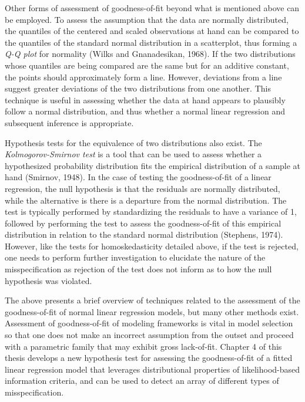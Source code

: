		Other forms of assessment of goodness-of-fit beyond what is mentioned above can be employed. To assess the assumption that the data are normally distributed, the quantiles of the centered
		and scaled observations at hand can be compared to the quantiles of the standard normal distribution in a scatterplot, thus forming a \textit{Q-Q plot} for normality (Wilks and Gnanadesikan, 1968).
		If the two distributions whose quantiles are being compared are the same but for an additive constant, the points should approximately form a line. However, deviations from a line suggest
		greater deviations of the two distributions from one another. This technique is useful in assessing whether the data at hand appears to plausibly follow a normal distribution, and thus
		whether a normal linear regression and subsequent inference is appropriate.
		
		Hypothesis tests for the equivalence of two distributions also exist. The \textit{Kolmogorov-Smirnov test} is a tool that can be used to assess whether a hypothesized probability distribution
		fits the empirical distribution of a sample at hand (Smirnov, 1948). In the case of testing the goodness-of-fit of a linear regression, the null hypothesis is that the residuals are normally
		distributed, while the alternative is there is a departure from the normal distribution. The test is typically performed by standardizing the residuals to have a variance of 1,
		followed by performing the test to assess the goodness-of-fit of this empirical distribution in relation to the standard normal distribution (Stephens, 1974). However, like the tests for
		homoskedasticity detailed above, if the test is rejected, one needs to perform further investigation to elucidate the nature of the misspecification as rejection of the test does not inform
		as to how the null hypothesis was violated.

		The above presents a brief overview of techniques related to the assessment of the goodness-of-fit of normal linear regression models, but many other methods exist. Assessment of goodness-of-fit
		of modeling frameworks is vital in model selection so that one does not make an incorrect assumption from the outset and proceed with a parametric family that may exhibit gross lack-of-fit.
		Chapter 4 of this thesis develops a new hypothesis test for assessing the goodness-of-fit of a fitted linear regression model that leverages distributional properties of likelihood-based
		information criteria, and can be used to detect an array of different types of misspecification.

